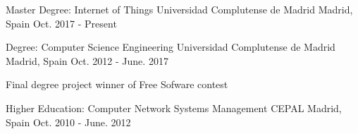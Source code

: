 

\begin{cventries}

  \cventry
    {Master Degree: Internet of Things}
    {Universidad Complutense de Madrid} %
    {Madrid, Spain} %
    {Oct. 2017 - Present} %
    {
    }

  \cventry
    {Degree: Computer Science Engineering}
    {Universidad Complutense de Madrid} %
    {Madrid, Spain} %
    {Oct. 2012 - June. 2017} %
    {
      \begin{cvitems} %
        \item {Final degree project winner of Free Sofware contest}
      \end{cvitems}
    }

  \cventry
    {Higher Education: Computer Network Systems Management }
    {CEPAL} %
    {Madrid, Spain} %
    {Oct. 2010 - June. 2012} %
    {
    }

\end{cventries}
